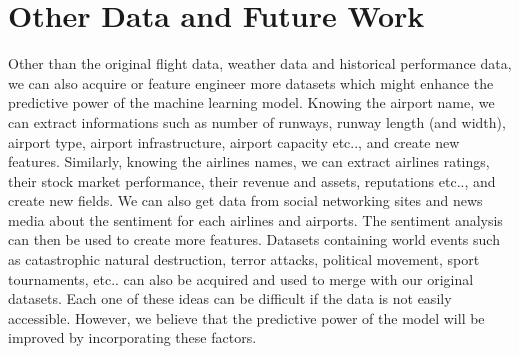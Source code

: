 \documentclass[12pt]{article}
\begin{document}
\section{Other Data and Future Work}
\label{sec:otherdata}
Other than the original flight data, weather data and historical performance data, we can also acquire or feature engineer more datasets which might enhance the predictive power of the machine learning model. Knowing the airport name, we can extract informations such as number of runways, runway length (and width), airport type, airport infrastructure, airport capacity etc.., and create new features. Similarly, knowing the airlines names, we can extract airlines ratings, their stock market performance, their revenue and assets, reputations etc.., and create new fields. We can also get data from social networking sites and news media about the sentiment for each airlines and airports. The sentiment analysis can then be used to create more features. Datasets containing world events such as catastrophic natural destruction, terror attacks, political movement, sport tournaments, etc.. can also be acquired and used to merge with our original datasets. Each one of these ideas can be difficult if the data is not easily accessible. However, we believe that the predictive power of the model will be improved by incorporating these factors.  
\end{document}
